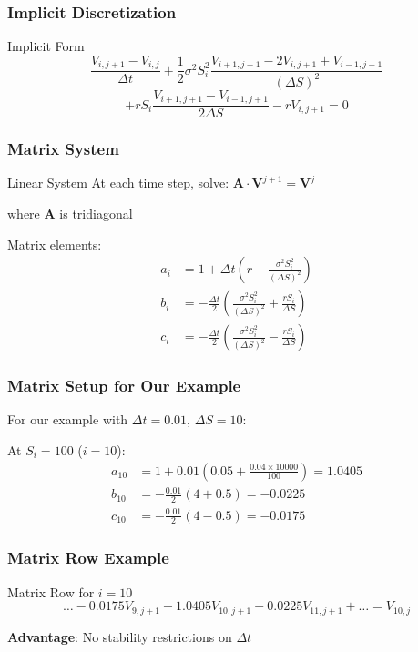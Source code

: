 \documentclass[aspectratio=169]{beamer}
\begin{document}
\begin{frame}
\frametitle{Implicit Discretization}
\begin{block}{Implicit Form}
\[\frac{V_{i,j+1} - V_{i,j}}{\Delta t} + \frac{1}{2}\sigma^2 S_i^2 \frac{V_{i+1,j+1} - 2V_{i,j+1} + V_{i-1,j+1}}{(\Delta S)^2}\]
\[+ rS_i \frac{V_{i+1,j+1} - V_{i-1,j+1}}{2\Delta S} - rV_{i,j+1} = 0\]
\end{block}
\end{frame}

\begin{frame}
\frametitle{Matrix System}
\begin{block}{Linear System}
At each time step, solve: \(\mathbf{A} \cdot \mathbf{V}^{j+1} = \mathbf{V}^j\)

where \(\mathbf{A}\) is tridiagonal
\end{block}

Matrix elements:
\begin{align}
a_i &= 1 + \Delta t \left( r + \frac{\sigma^2 S_i^2}{(\Delta S)^2} \right) \\
b_i &= -\frac{\Delta t}{2} \left( \frac{\sigma^2 S_i^2}{(\Delta S)^2} + \frac{rS_i}{\Delta S} \right) \\
c_i &= -\frac{\Delta t}{2} \left( \frac{\sigma^2 S_i^2}{(\Delta S)^2} - \frac{rS_i}{\Delta S} \right)
\end{align}
\end{frame}

\begin{frame}
\frametitle{Matrix Setup for Our Example}
For our example with \(\Delta t = 0.01\), \(\Delta S = 10\):

At \(S_i = 100\) (\(i = 10\)):
\begin{align}
a_{10} &= 1 + 0.01(0.05 + \frac{0.04 \times 10000}{100}) = 1.0405 \\
b_{10} &= -\frac{0.01}{2}(4 + 0.5) = -0.0225 \\
c_{10} &= -\frac{0.01}{2}(4 - 0.5) = -0.0175
\end{align}
\end{frame}

\begin{frame}
\frametitle{Matrix Row Example}
\begin{block}{Matrix Row for \(i = 10\)}
\[\ldots - 0.0175 V_{9,j+1} + 1.0405 V_{10,j+1} - 0.0225 V_{11,j+1} + \ldots = V_{10,j}\]
\end{block}

\textbf{Advantage}: No stability restrictions on \(\Delta t\)
\end{frame}
\end{document}
